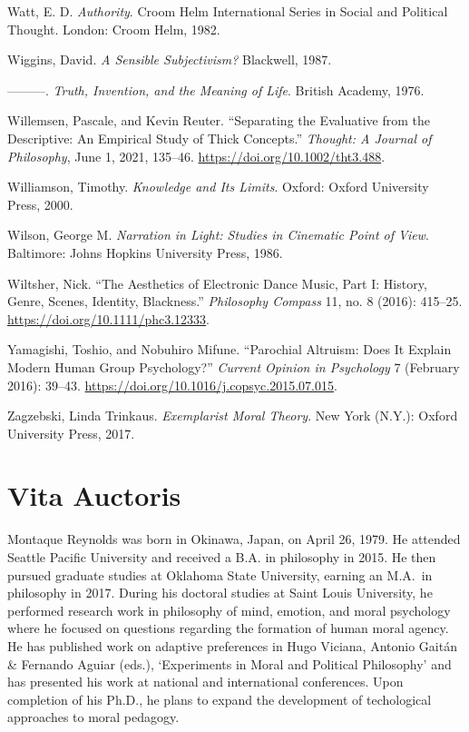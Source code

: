 \documentclass[phdthesis,12pt,final]{wuthesis}
\newlength{\cslhangindent}
\newenvironment{CSLReferences}[2] %
{\begin{list}{}{%
	\setlength{\itemindent}{0pt}
	\setlength{\leftmargin}{0pt}
	\setlength{\parsep}{0pt}
	\ifodd #1
	\setlength{\leftmargin}{\cslhangindent}
	\setlength{\itemindent}{-1\cslhangindent}
	\fi
	\setlength{\itemsep}{#2\baselineskip}}}
{\end{list}}
\theoremstyle{definition}
\theoremstyle{definition}
\theoremstyle{definition}
\theoremstyle{definition}
\theoremstyle{remark}
\begin{document}
\begin{CSLReferences}{1}{0}
Watt, E. D. \emph{Authority}. Croom {Helm} International Series in Social and Political Thought. London: Croom Helm, 1982.

Wiggins, David. \emph{A {Sensible Subjectivism}?} Blackwell, 1987.

---------. \emph{Truth, {Invention}, and the {Meaning} of {Life}}. British Academy, 1976.

Willemsen, Pascale, and Kevin Reuter. {``Separating the Evaluative from the Descriptive: {An} Empirical Study of Thick Concepts.''} \emph{Thought: A Journal of Philosophy}, June 1, 2021, 135--46. \url{https://doi.org/10.1002/tht3.488}.

Williamson, Timothy. \emph{Knowledge and {Its Limits}}. Oxford: Oxford University Press, 2000.

Wilson, George M. \emph{Narration in Light: Studies in Cinematic Point of View}. Baltimore: Johns Hopkins University Press, 1986.

Wiltsher, Nick. {``The {Aesthetics} of {Electronic Dance Music}, {Part I}: {History}, {Genre}, {Scenes}, {Identity}, {Blackness}.''} \emph{Philosophy Compass} 11, no. 8 (2016): 415--25. \url{https://doi.org/10.1111/phc3.12333}.

Yamagishi, Toshio, and Nobuhiro Mifune. {``Parochial {Altruism}: {Does It Explain Modern Human Group Psychology}?''} \emph{Current Opinion in Psychology} 7 (February 2016): 39--43. \url{https://doi.org/10.1016/j.copsyc.2015.07.015}.

Zagzebski, Linda Trinkaus. \emph{Exemplarist {Moral Theory}}. New York (N.Y.): Oxford University Press, 2017.

\end{CSLReferences}

\backmatter

\cleardoublepage
{}
{}
\chapter*{Vita Auctoris}
\begin{doublespace}
Montaque Reynolds was born in Okinawa, Japan, on April 26, 1979. He attended Seattle Pacific University and received a B.A. in philosophy in 2015. He then pursued graduate studies at Oklahoma State University, earning an M.A.~in philosophy in 2017. During his doctoral studies at Saint Louis University, he performed research work in philosophy of mind, emotion, and moral psychology where he focused on questions regarding the formation of human moral agency. He has published work on adaptive preferences in Hugo Viciana, Antonio Gaitán \& Fernando Aguiar (eds.), `Experiments in Moral and Political Philosophy' and has presented his work at national and international conferences. Upon completion of his Ph.D., he plans to expand the development of techological approaches to moral pedagogy.
\end{doublespace}
\end{document}
